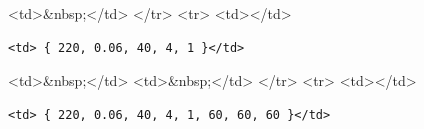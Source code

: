 \textless{}td\textgreater{}\&nbsp;\textless{}/td\textgreater{} \textless{}/tr\textgreater{} \textless{}tr\textgreater{} \textless{}td\textgreater{}\textless{}/td\textgreater{}

\begin{verbatim}
<td> { 220, 0.06, 40, 4, 1 }</td>
\end{verbatim}

\textless{}td\textgreater{}\&nbsp;\textless{}/td\textgreater{} \textless{}td\textgreater{}\&nbsp;\textless{}/td\textgreater{} \textless{}/tr\textgreater{} \textless{}tr\textgreater{} \textless{}td\textgreater{}\textless{}/td\textgreater{}

\begin{verbatim}
<td> { 220, 0.06, 40, 4, 1, 60, 60, 60 }</td>
\end{verbatim}

